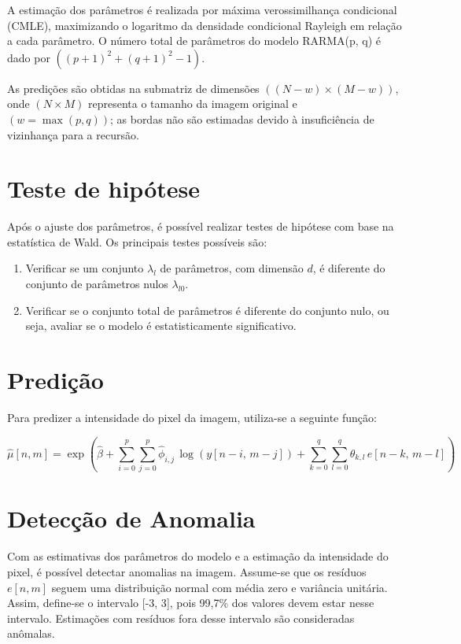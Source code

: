\documentclass[
]{article}
\begin{document}
A estimação dos parâmetros é realizada por máxima verossimilhança condicional (CMLE), maximizando o logaritmo da densidade condicional Rayleigh em relação a cada parâmetro. O número total de parâmetros do modelo RARMA(p, q) é dado por \(( (p+1)^2 + (q+1)^2 - 1)\).

As predições são obtidas na submatriz de dimensões \(( (N - w) \times (M - w))\), onde \(( N \times M)\) representa o tamanho da imagem original e \((w = \max(p, q))\); as bordas não são estimadas devido à insuficiência de vizinhança para a recursão.

\hypertarget{teste-de-hipuxf3tese}{%
\section{Teste de hipótese}\label{teste-de-hipuxf3tese}}

Após o ajuste dos parâmetros, é possível realizar testes de hipótese com base na estatística de Wald. Os principais testes possíveis são:

\begin{enumerate}
  \item Verificar se um conjunto $\lambda_l$ de parâmetros, com dimensão $d$, é diferente do conjunto de parâmetros nulos $\lambda_{l0}$.
  \item Verificar se o conjunto total de parâmetros é diferente do conjunto nulo, ou seja, avaliar se o modelo é estatisticamente significativo.
\end{enumerate}

\hypertarget{prediuxe7uxe3o}{%
\section{Predição}\label{prediuxe7uxe3o}}

Para predizer a intensidade do pixel da imagem, utiliza-se a seguinte função:

\[
\hat{\mu}[n, m] =
\exp\!\left(
\hat{\beta} +
\sum_{i=0}^{p}\sum_{j=0}^{p} \hat{\phi}_{i,j}\, \log(y[n-i,\,m-j]) +
\sum_{k=0}^{q}\sum_{l=0}^{q} \hat{\theta}_{k,l}\, e[n-k,\,m-l]
\right)
\]

\hypertarget{detecuxe7uxe3o-de-anomalia}{%
\section{Detecção de Anomalia}\label{detecuxe7uxe3o-de-anomalia}}

Com as estimativas dos parâmetros do modelo e a estimação da intensidade do pixel, é possível detectar anomalias na imagem. Assume-se que os resíduos \(e[n, m]\) seguem uma distribuição normal com média zero e variância unitária. Assim, define-se o intervalo {[}-3, 3{]}, pois 99,7\% dos valores devem estar nesse intervalo. Estimações com resíduos fora desse intervalo são consideradas anômalas.
\end{document}
